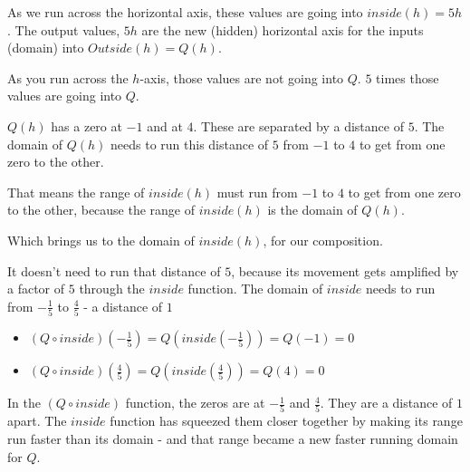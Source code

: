 \documentclass{ximera}
\begin{document}
As we run across the horizontal axis, these values are going into $inside(h) = 5h$.  The output values, $5h$ are the new (hidden) horizontal axis for the inputs (domain) into $Outside(h) = Q(h)$.

As you run across the $h$-axis, those values are not going into $Q$.  $5$ times those values are going into $Q$.





\begin{observation}






$Q(h)$ has a zero at $-1$ and at $4$.  These are separated by a distance of $5$. The domain of $Q(h)$ needs to run this distance of $5$ from $-1$ to $4$ to get from one zero to the other.


That means the range of $inside(h)$ must run from  $-1$ to $4$ to get from one zero to the other, because the range of $inside(h)$ is the domain of $Q(h)$.

Which brings us to the domain of $inside(h)$, for our composition. 

It doesn't need to run that distance of $5$, because its movement gets amplified by a factor of $5$ through the $inside$ function.  The domain of $inside$ needs to run from $-\frac{1}{5}$ to $\frac{4}{5}$ - a distance of $1$




\begin{itemize}
\item $(Q \circ inside)\left(-\frac{1}{5}\right) = Q\left(inside\left(-\frac{1}{5}\right)\right) = Q(-1) = 0$
\item $(Q \circ inside)\left(\frac{4}{5}\right) = Q\left(inside\left(\frac{4}{5}\right)\right) = Q(4) = 0$
\end{itemize}


In the $(Q \circ inside)$ function, the zeros are at $-\frac{1}{5}$ and $\frac{4}{5}$.  They are a distance of $1$ apart.  The $inside$ function has squeezed them closer together by making its range run faster than its domain - and that range became a new faster running domain for $Q$.




\end{observation}
\end{document}
